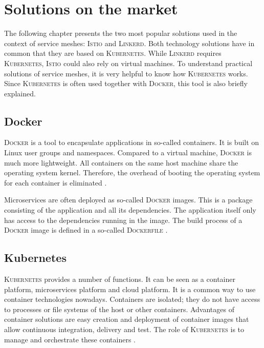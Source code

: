 \section{Solutions on the market}

The following chapter presents the two most popular solutions used in the context of service meshes: \textsc{Istio} and \textsc{Linkerd}. Both technology solutions have in common that they are based on \textsc{Kubernetes}. While \textsc{Linkerd} requires \textsc{Kubernetes}, \textsc{Istio} could also rely on virtual machines. To understand practical solutions of service meshes, it is very helpful to know how \textsc{Kubernetes} works. Since \textsc{Kubernetes} is often used together with \textsc{Docker}, this tool is also briefly explained.

\subsection{Docker}

\textsc{Docker} is a tool to encapsulate applications in so-called containers. It is built on Linux user groups and namespaces. Compared to a virtual machine, \textsc{Docker} is much more lightweight. All containers on the same host machine share the operating system kernel. Therefore, the overhead of booting the operating system for each container is eliminated \cite[p. 220 ff.]{sm3}.

Microservices are often deployed as so-called \textsc{Docker} images. This is a package consisting of the application and all its dependencies. The application itself only has access to the dependencies running in the image. The build process of a \textsc{Docker} image is defined in a so-called \textsc{Dockerfile} \cite[p. 224]{sm3}.

\subsection{Kubernetes}

\textsc{Kubernetes} provides a number of functions. It can be seen as a container platform, microservices platform and cloud platform.
It is a common way to use container technologies nowadays. Containers are isolated; they do not have access to processes or file systems of the host or other containers.
Advantages of container solutions are easy creation and deployment of container images that allow continuous integration, delivery and test. The role of \textsc{Kubernetes} is to manage and orchestrate these containers \cite{k8s}.

